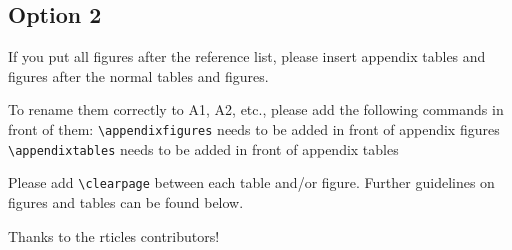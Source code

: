 \documentclass[gmd, manuscript]{copernicus}
\begin{document}
\subsection{Option 2}

If you put all figures after the reference list, please insert appendix
tables and figures after the normal tables and figures.

To rename them correctly to A1, A2, etc., please add the following
commands in front of them: \texttt{\textbackslash{}appendixfigures}
needs to be added in front of appendix figures
\texttt{\textbackslash{}appendixtables} needs to be added in front of
appendix tables

Please add \texttt{\textbackslash{}clearpage} between each table and/or
figure. Further guidelines on figures and tables can be found below.
\noappendix




\begin{acknowledgements}
Thanks to the rticles contributors!
\end{acknowledgements}







\end{document}
